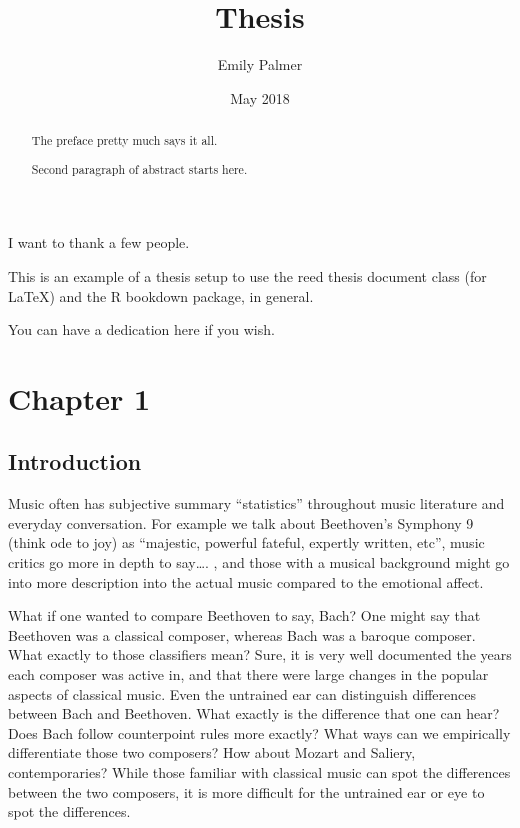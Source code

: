 \documentclass[12pt,twoside]{reedthesis}
\title{Thesis}
\author{Emily Palmer}
\date{May 2018}
\theoremstyle{definition}
\theoremstyle{definition}
\theoremstyle{definition}
\theoremstyle{remark}
\begin{document}
  \maketitle

\frontmatter %
\pagestyle{empty} %
  \begin{acknowledgements}
    I want to thank a few people.
  \end{acknowledgements}
  \begin{preface}
    This is an example of a thesis setup to use the reed thesis document
    class (for LaTeX) and the R bookdown package, in general.
  \end{preface}
  \hypersetup{linkcolor=black}
  \setcounter{tocdepth}{2}
  \tableofcontents

  \listoftables

  \listoffigures
  \begin{abstract}
    The preface pretty much says it all. \par
    
    Second paragraph of abstract starts here.
  \end{abstract}
  \begin{dedication}
    You can have a dedication here if you wish.
  \end{dedication}
\mainmatter %
\pagestyle{fancyplain} %

\chapter{Chapter 1}\label{chapter-1}

\section{Introduction}\label{introduction}

Music often has subjective summary ``statistics'' throughout music
literature and everyday conversation. For example we talk about
Beethoven's Symphony 9 (think ode to joy) as ``majestic, powerful
fateful, expertly written, etc'', music critics go more in depth to
say\ldots{}. , and those with a musical background might go into more
description into the actual music compared to the emotional affect.

What if one wanted to compare Beethoven to say, Bach? One might say that
Beethoven was a classical composer, whereas Bach was a baroque composer.
What exactly to those classifiers mean? Sure, it is very well documented
the years each composer was active in, and that there were large changes
in the popular aspects of classical music. Even the untrained ear can
distinguish differences between Bach and Beethoven. What exactly is the
difference that one can hear? Does Bach follow counterpoint rules more
exactly? What ways can we empirically differentiate those two composers?
How about Mozart and Saliery, contemporaries? While those familiar with
classical music can spot the differences between the two composers, it
is more difficult for the untrained ear or eye to spot the differences.
\end{document}
